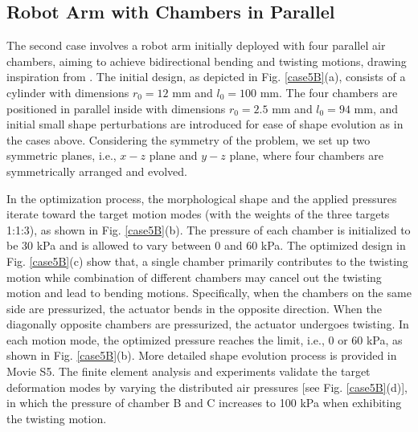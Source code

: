 \documentclass[journal]{IEEEtran}
\theoremstyle{definition}
\begin{document}
\subsection{Robot Arm with Chambers in Parallel}
The second case involves a robot arm initially deployed with four parallel air chambers, aiming to achieve bidirectional bending and twisting motions, drawing inspiration from \cite{lipton2018handedness}. The initial design, as depicted in Fig. \ref{case5B}(a), consists of a cylinder with dimensions $r_0=12$ mm and $l_0=100$ mm. The four chambers are positioned in parallel inside with dimensions $r_0=2.5$ mm and $l_0=94$ mm, and initial small shape perturbations are introduced for ease of shape evolution as in the cases above. Considering the symmetry of the problem, we set up two symmetric planes, i.e., $x-z$ plane and $y-z$ plane, where four chambers are symmetrically arranged and evolved.

In the optimization process, the morphological shape and the applied pressures iterate toward the target motion modes (with the weights of the three targets 1:1:3), as shown in Fig. \ref{case5B}(b). The pressure of each chamber is initialized to be 30 kPa and is allowed to vary between 0 and 60 kPa. The optimized design in Fig. \ref{case5B}(c) show that, a single chamber primarily contributes to the twisting motion while combination of different chambers may cancel out the twisting motion and lead to bending motions. Specifically, when the chambers on the same side are pressurized, the actuator bends in the opposite direction. When the diagonally opposite chambers are pressurized, the actuator undergoes twisting. In each motion mode, the optimized pressure reaches the limit, i.e., 0 or 60 kPa, as shown in Fig. \ref{case5B}(b). More detailed shape evolution process is provided in Movie S5. The finite element analysis and experiments validate the target deformation modes by varying the distributed air pressures [see Fig. \ref{case5B}(d)], in which the pressure of chamber B and C increases to 100 kPa when exhibiting the twisting motion.


\end{document}
